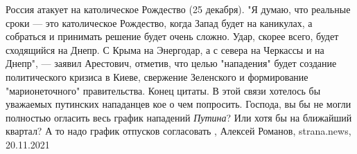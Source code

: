  
 
 
 
 

Россия атакует на католическое Рождество (25 декабря).  "Я думаю, что реальные
сроки — это католическое Рождество, когда Запад будет на каникулах, а собраться
и принимать решение будет очень сложно.  Удар, скорее всего, будет сходящийся
на Днепр. С Крыма на Энергодар, а с севера на Черкассы и на Днепр", — заявил
Арестович, отметив, что целью "нападения" будет создание политического кризиса
в Киеве, свержение Зеленского и формирование "марионеточного" правительства.
Конец цитаты.  В этой связи хотелось бы уважаемых путинских нападанцев кое о
чем попросить.  Господа, вы бы не могли полностью огласить весь график
нападений \emph{Путина}?  Или хотя бы на ближайший квартал?  А то надо график
отпусков согласовать
, 
Алексей Романов, strana.news, 20.11.2021
